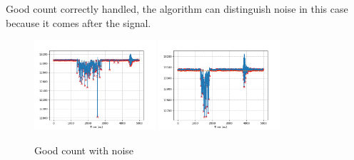\documentclass[a4paper,twoside,openany]{book}
\begin{document}
Good count correctly handled, the algorithm can distinguish noise in this case because it comes after the signal.
\begin{figure}[H]
\centering
\includegraphics[width=0.4\textwidth, height=0.3\textwidth]{All}
\includegraphics[width=0.4\textwidth, height=0.3\textwidth]{Bad_rumore2}
\caption{Good count with noise}
\end{figure}
\end{document}
